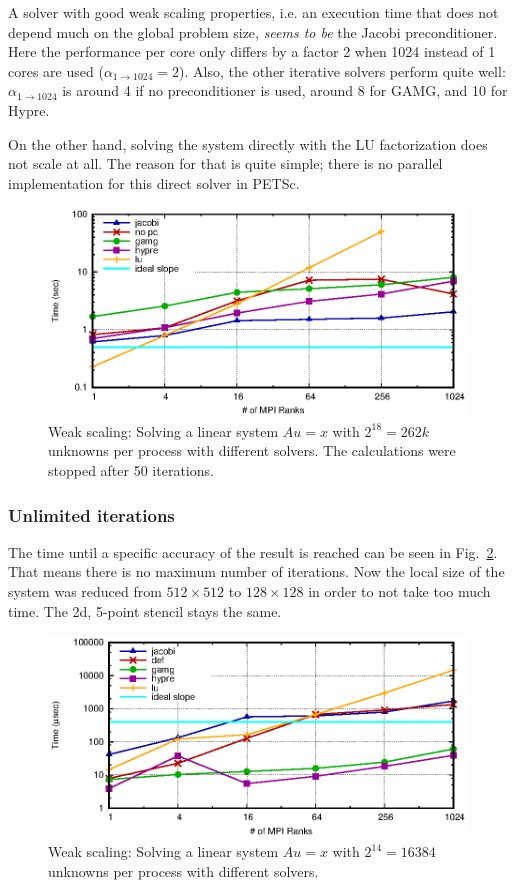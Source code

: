 A solver with good weak scaling properties, i.e. an execution time that does not depend much on the global problem size, \textit{seems to be} the Jacobi preconditioner. Here the performance per core only differs by a factor 2 when 1024 instead of 1 cores are used ($\alpha_{1 \rightarrow 1024} = 2$). Also, the other iterative solvers perform quite well:  $\alpha_{1 \rightarrow 1024}$ is around 4 if no preconditioner is used, around 8 for GAMG, and 10 for Hypre. 

On the other hand, solving the system directly with the LU factorization does not scale at all. The reason for that is quite simple; there is no parallel implementation for this direct solver in PETSc.

\begin{figure}[tb]
	\centering
	\includegraphics[width=0.99\textwidth]{ex2_weak_time}
	\caption{Weak scaling: Solving a linear system $Au = x$ with $2^{18} = 262k$ unknowns per process with different solvers. The calculations were stopped after 50 iterations.} 
	\label{fig:ex2_weak_time}
\end{figure}

\subsubsection*{Unlimited iterations}
The time until a specific accuracy of the result is reached can be seen in Fig.~\ref{fig:ex2_weak_nomaxit}. That means there is no maximum number of iterations. Now the local size of the system was reduced from $512\times 512$ to $128\times 128$ in order to not take too much time. The 2d, 5-point stencil stays the same.

\begin{figure}[tb]
	\centering
	\includegraphics[width=0.99\textwidth]{ex2_weak_nomaxit}
	\caption{Weak scaling: Solving a linear system $Au = x$ with $2^{14} = 16384$ unknowns per process with different solvers. } 
	\label{fig:ex2_weak_nomaxit}
\end{figure}

